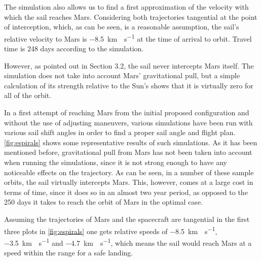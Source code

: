 \documentclass[twocolumn,12pt,a4paper]{article}
\numberwithin{equation}{section}
\begin{document}
The simulation also allows us to find a first approximation of the velocity with which the sail reaches Mars. Considering both trajectories tangential at the point of interception, which, as can be seen, is a reasonable assumption, the sail's relative velocity to Mars is \SI{-8,5}{km\cdot s^{-1}} at the time of arrival to orbit. Travel time is 248 days according to the simulation.

However, as pointed out in Section 3.2, the sail never intercepts Mars itself. The simulation does not take into account Mars' gravitational pull, but a simple calculation of its strength relative to the Sun's shows that it is virtually zero for all of the orbit.
 
In a first attempt of reaching Mars from the initial proposed configuration and without the use of adjusting maneuvers, various simulations have been run with various sail shift angles in order to find a proper sail angle and flight plan. \autoref{fig:espirals} shows some representative results of such simulations. As it has been mentioned before, gravitational pull from Mars has not been taken into account when running the simulations, since it is not strong enough to have any noticeable effects on the trajectory. As can be seen, in a number of these sample orbits, the sail virtually intercepts Mars. This, however, comes at a large cost in terms of time, since it does so in an almost two year period, as opposed to the 250 days it takes to reach the orbit of Mars in the optimal case.

Assuming the trajectories of Mars and the spacecraft are tangential in the first three plots in \autoref{fig:espirals} one gets relative speeds of \SI{-8,5}{km\cdot s^{-1}}, \SI{-3.5}{km\cdot s^{-1}}  and \SI{-4.7}{km\cdot s^{-1}}, which means the sail would reach Mars at a speed within the range for a safe landing.
\end{document}
